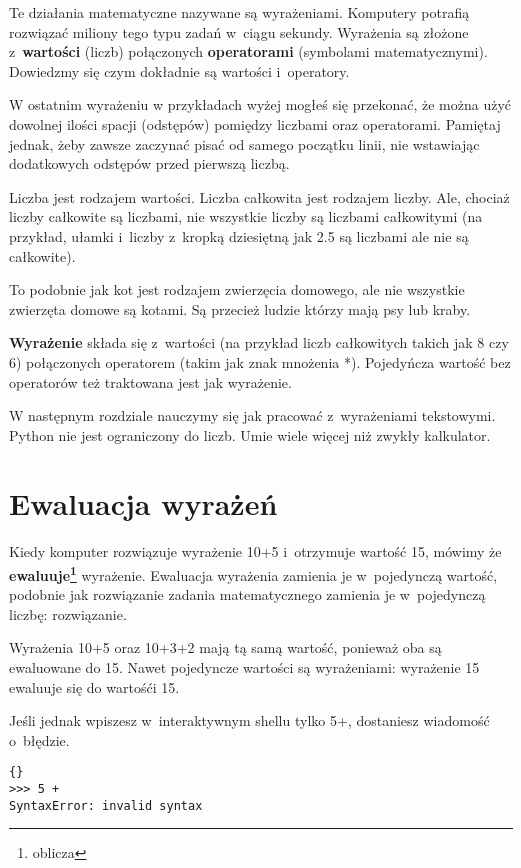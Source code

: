 \documentclass{book}
\begin{document}
Te działania matematyczne nazywane są wyrażeniami. Komputery potrafią rozwiązać miliony tego typu zadań w~ciągu sekundy. Wyrażenia są złożone z~{\bf wartości} (liczb) połączonych {\bf operatorami} (symbolami matematycznymi). Dowiedzmy się czym dokładnie są wartości i~operatory.

W ostatnim wyrażeniu w przykładach wyżej mogłeś się przekonać, że można użyć dowolnej ilości spacji (odstępów) pomiędzy liczbami oraz operatorami. Pamiętaj jednak, żeby zawsze zaczynać pisać od samego początku linii, nie wstawiając dodatkowych odstępów przed pierwszą liczbą.

Liczba jest rodzajem wartości. Liczba całkowita jest rodzajem liczby. Ale, chociaż liczby całkowite są liczbami, nie wszystkie liczby są liczbami całkowitymi (na przykład, ułamki i~liczby z~kropką dziesiętną jak 2.5 są liczbami ale nie są całkowite).

To podobnie jak kot jest rodzajem zwierzęcia domowego, ale nie wszystkie zwierzęta domowe są kotami. Są przecież ludzie którzy mają psy lub kraby. 

{\bf Wyrażenie} składa się z~wartości (na przykład liczb całkowitych takich jak 8 czy 6) połączonych operatorem (takim jak znak mnożenia *). Pojedyńcza wartość bez operatorów też traktowana jest jak wyrażenie.

W następnym rozdziale nauczymy się jak pracować z~wyrażeniami tekstowymi. Python nie jest ograniczony do liczb. Umie wiele więcej niż zwykły kalkulator.

\section{Ewaluacja wyrażeń}

Kiedy komputer rozwiązuje wyrażenie 10+5 i~otrzymuje wartość 15, mówimy że {\bf ewaluuje\footnote{oblicza}} wyrażenie. Ewaluacja wyrażenia zamienia je w~pojedynczą wartość, podobnie jak rozwiązanie zadania matematycznego zamienia je w~pojedynczą liczbę: rozwiązanie.

Wyrażenia 10+5 oraz 10+3+2 mają tą samą wartość, ponieważ oba są ewaluowane do 15. Nawet pojedyncze wartości są wyrażeniami: wyrażenie 15 ewaluuje się do wartośći 15.

Jeśli jednak wpiszesz w~interaktywnym shellu tylko 5+, dostaniesz wiadomość o~błędzie.
\lstset{language=python}
\begin{lstlisting}{}
>>> 5 +
SyntaxError: invalid syntax
\end{lstlisting}
\end{document}
